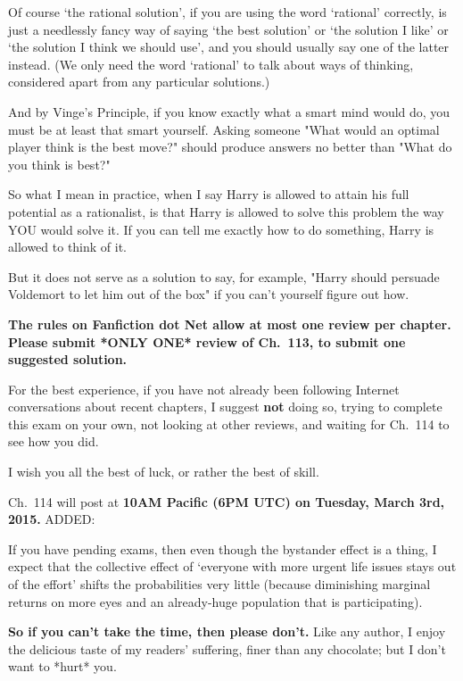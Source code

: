 \SmallVSpace
\noindent
Of course `the rational solution',
if you are using the word `rational' correctly,
is just a needlessly fancy way of saying `the best solution'
or `the solution I like' or `the solution I think we should use',
and you should usually say one of the latter instead.
(We only need the word `rational' to talk about ways of thinking,
considered apart from any particular solutions.)

\SmallVSpace
\noindent
And by Vinge's Principle,
if you know exactly what a smart mind would do,
you must be at least that smart yourself.
Asking someone "What would an optimal player think is the best move?"
should produce answers no better than "What do you think is best?"

\SmallVSpace
\noindent
So what I mean in practice,
when I say Harry is allowed to attain his full potential as a
rationalist,
is that Harry is allowed to solve this problem
the way YOU would solve it.
If you can tell me exactly how to do something,
Harry is allowed to think of it.

\SmallVSpace
\noindent
But it does not serve as a solution to say, for example,
"Harry should persuade Voldemort to let him out of the box"
if you can't yourself figure out how.

\SmallVSpace
\noindent
\textbf{The rules on Fanfiction dot Net allow at most one review per
chapter.
Please submit *ONLY ONE* review of Ch.~113,
to submit one suggested solution.}

\SmallVSpace
\noindent
For the best experience, if you have not already been following
Internet conversations about recent chapters, I suggest
\textbf{not} doing so,
trying to complete this exam on your own,
not looking at other reviews,
and waiting for Ch.~114 to see how you did.

\SmallVSpace
\noindent
I wish you all the best of luck, or rather the best of skill.

\SmallVSpace
\noindent
Ch.~114 will post at \textbf{10AM Pacific (6PM UTC) on Tuesday, March
3rd, 2015.}
\sbreak
ADDED:

\SmallVSpace
\noindent
If you have pending exams,
then even though the bystander effect is a thing,
I expect that the collective effect of
`everyone with more urgent life issues stays out of the effort'
shifts the probabilities very little
(because diminishing marginal returns on more eyes
and an already-huge population that is participating).

\SmallVSpace
\noindent
\textbf{So if you can't take the time, then please don't.}
Like any author, I enjoy the delicious taste of my readers' suffering,
finer than any chocolate; but I don't want to *hurt* you.

